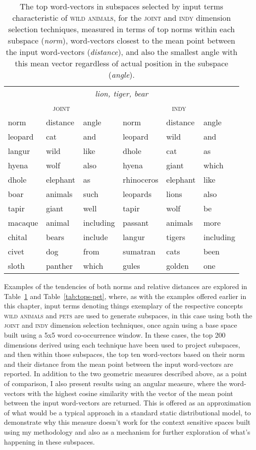 \begin{table}
\centering
\begin{tabular}{lll|lll}
\hline
\multicolumn{6}{c}{\emph{lion, tiger, bear}} \\
\multicolumn{3}{c}{\textsc{joint}} & \multicolumn{3}{c}{\textsc{indy}} \\
\hline
norm & distance & angle & norm & distance & angle \\
\hline
leopard & cat & and & leopard & wild & and \\
langur & wild & like & dhole & cat & as \\
hyena & wolf & also & hyena & giant & which \\
dhole & elephant & as & rhinoceros & elephant & like \\
boar & animals & such & leopards & lions & also \\
tapir & giant & well & tapir & wolf & be \\
macaque & animal & including & passant & animals & more \\
chital & bears & include & langur & tigers & including \\
civet & dog & from & sumatran & cats & been \\
sloth & panther & which & gules & golden & one \\
\hline
\end{tabular}
\caption[Top Wild Animal Word-Vectors]{The top word-vectors in subspaces selected by input terms characteristic of \textsc{wild animals}, for the \textsc{joint} and \textsc{indy} dimension selection techniques, measured in terms of top norms within each subspace (\emph{norm}), word-vectors closest to the mean point between the input word-vectors (\emph{distance}), and also the smallest angle with this mean vector regardless of actual position in the subspace (\emph{angle}).}
\label{tab:tops-wild}
\end{table}

Examples of the tendencies of both norms and relative distances are explored in Table~\ref{tab:tops-wild} and Table~\ref{tab:tops-pet}, where, as with the examples offered earlier in this chapter, input terms denoting things exemplary of the respective concepts \textsc{wild animals} and \textsc{pets} are used to generate subspaces, in this case using both the \textsc{joint} and \textsc{indy} dimension selection techniques, once again using a base space built using a 5x5 word co-occurrence window.  In these cases, the top 200 dimensions derived using each technique have been used to project subspaces, and then within those subspaces, the top ten word-vectors based on their norm and their distance from the mean point between the input word-vectors are reported.  In addition to the two geometric measures described above, as a point of comparison, I also present results using an angular measure, where the word-vectors with the highest cosine similarity with the vector of the mean point between the input word-vectors are returned.  This is offered as an approximation of what would be a typical approach in a standard static distributional model, to demonstrate why this measure doesn't work for the context sensitive spaces built using my methodology and also as a mechanism for further exploration of what's happening in these subspaces.

